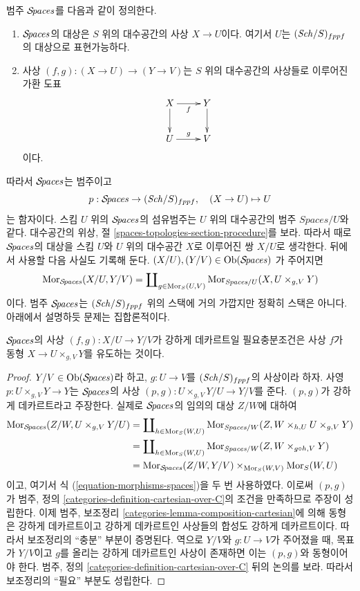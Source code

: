 \noindent
범주 $\mathcal{S}\!\mathit{paces}$를 다음과 같이 정의한다.
\begin{enumerate}
\item $\mathcal{S}\!\mathit{paces}$의 대상은 $S$ 위의 대수공간의 사상 $X \to U$이다.
여기서 $U$는 $(\mathit{Sch}/S)_{fppf}$의 대상으로 표현가능하다.
\item 사상 $(f, g) : (X \to U) \to (Y \to V)$는 $S$ 위의 대수공간의
사상들로 이루어진 가환 도표
$$
\xymatrix{
X \ar[d] \ar[r]_f & Y \ar[d] \\
U \ar[r]^g & V
}
$$
이다.
\end{enumerate}
따라서 $\mathcal{S}\!\mathit{paces}$는 범주이고
$$
p : \mathcal{S}\!\mathit{paces} \to (\mathit{Sch}/S)_{fppf},
\quad
(X \to U) \mapsto U
$$
는 함자이다. 스킴 $U$ 위의 $\mathcal{S}\!\mathit{paces}$의 섬유범주는 $U$ 위의
대수공간의 범주 $\textit{Spaces}/U$와 같다. 대수공간의 위상, 절
\ref{spaces-topologies-section-procedure}를 보라. 따라서 때로
$\mathcal{S}\!\mathit{paces}$의 대상을 스킴 $U$와 $U$ 위의 대수공간 $X$로 이루어진 쌍
$X/U$로 생각한다. 뒤에서 사용할 다음 사실도 기록해 둔다.
$(X/U), (Y/V) \in \mathop{\mathrm{Ob}}\nolimits(\mathcal{S}\!\mathit{paces})$
가 주어지면
\begin{equation}
\label{equation-morphisms-spaces}
\mathop{\mathrm{Mor}}\nolimits_{\mathcal{S}\!\mathit{paces}}(X/U, Y/V)
=
\coprod\nolimits_{g \in \mathop{\mathrm{Mor}}\nolimits_S(U, V)}
\mathop{\mathrm{Mor}}\nolimits_{\textit{Spaces}/U}(X, U \times_{g, V} Y)
\end{equation}
이다. 범주 $\mathcal{S}\!\mathit{paces}$는 $(\mathit{Sch}/S)_{fppf}$ 위의 스택에 거의
가깝지만 정확히 스택은 아니다. 아래에서 설명하듯 문제는 집합론적이다.

\begin{lemma}
\label{lemma-spaces-strongly-cartesian}
$\mathcal{S}\!\mathit{paces}$의 사상 $(f, g) : X/U \to Y/V$가 강하게 데카르트일
필요충분조건은 사상 $f$가 동형 $X \to U \times_{g, V} Y$를 유도하는
것이다.
\end{lemma}

\begin{proof}
$Y/V \in \mathop{\mathrm{Ob}}\nolimits(\mathcal{S}\!\mathit{paces})$라 하고, $g : U \to V$를
$(\mathit{Sch}/S)_{fppf}$의 사상이라 하자. 사영
$p : U \times_{g, V} Y \to Y$는 $\mathcal{S}\!\mathit{paces}$의 사상
$(p, g) : U \times_{g, V} Y/U \to Y/V$를 준다. $(p, g)$가 강하게
데카르트라고 주장한다. 실제로 $\mathcal{S}\!\mathit{paces}$의 임의의 대상 $Z/W$에 대하여
\begin{align*}
\mathop{\mathrm{Mor}}\nolimits_{\mathcal{S}\!\mathit{paces}}(Z/W, U \times_{g, V} Y/U)
& =
\coprod\nolimits_{h \in \mathop{\mathrm{Mor}}\nolimits_S(W, U)}
\mathop{\mathrm{Mor}}\nolimits_{\textit{Spaces}/W}(Z, W \times_{h, U} U \times_{g, V} Y) \\
& =
\coprod\nolimits_{h \in \mathop{\mathrm{Mor}}\nolimits_S(W, U)}
\mathop{\mathrm{Mor}}\nolimits_{\textit{Spaces}/W}(Z, W \times_{g \circ h, V} Y) \\
& =
\mathop{\mathrm{Mor}}\nolimits_{\mathcal{S}\!\mathit{paces}}(Z/W, Y/V)
\times_{\mathop{\mathrm{Mor}}\nolimits_S(W, V)} \mathop{\mathrm{Mor}}\nolimits_S(W, U)
\end{align*}
이고, 여기서 식 (\ref{equation-morphisms-spaces})을 두 번 사용하였다.
이로써 $(p, g)$가 범주, 정의
\ref{categories-definition-cartesian-over-C}의 조건을 만족하므로 주장이
성립한다. 이제 범주, 보조정리
\ref{categories-lemma-composition-cartesian}에 의해 동형은 강하게
데카르트이고 강하게 데카르트인 사상들의 합성도 강하게 데카르트이다.
따라서 보조정리의 ``충분'' 부분이 증명된다. 역으로 $Y/V$와
$g : U \to V$가 주어졌을 때, 목표가 $Y/V$이고 $g$를 올리는 강하게
데카르트인 사상이 존재하면 이는 $(p, g)$와 동형이어야 한다. 범주, 정의
\ref{categories-definition-cartesian-over-C} 뒤의 논의를 보라. 따라서
보조정리의 ``필요'' 부분도 성립한다.
\end{proof}


